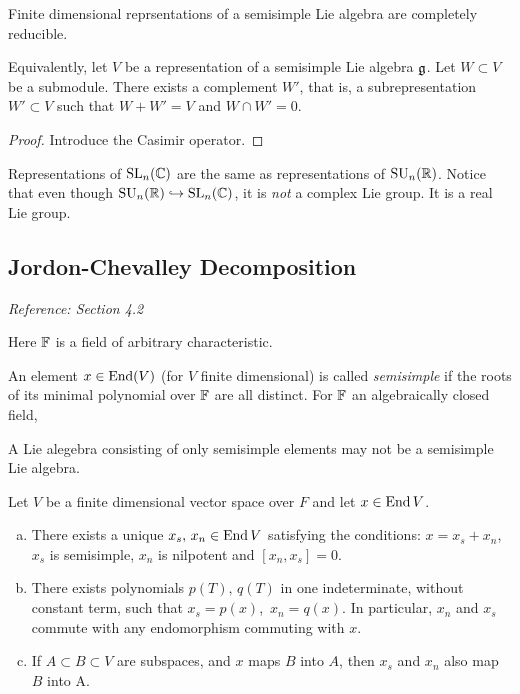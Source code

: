 \begin{theorem}
    \label{thm:weyl}
    Finite dimensional reprsentations of a semisimple Lie algebra are completely reducible. 

    Equivalently, let $V$ be a representation of a semisimple Lie algebra $\mathfrak{g}$. Let $W\subset V$ be a submodule. There exists a complement $W'$, that is, a subrepresentation $W'\subset V$ such that $W+W'=V$ and $W\cap W'=0$.
\end{theorem}
\begin{proof}
   Introduce the Casimir operator. 
\end{proof}

\begin{insight}
   Representations of $\text{SL}_n(\mathbb{C})$ are the same as representations of $\text{SU}_n(\mathbb{R})$. Notice that even though $\text{SU}_n(\mathbb{R}) \hookrightarrow \text{SL}_n(\mathbb{C})$, it is \emph{not} a complex Lie group. It is a real Lie group.
\end{insight}

\subsection{Jordon-Chevalley Decomposition}
\label{sub:jordon_chevalley_decomposition}

\emph{Reference: \cite{humphreys1972introduction} Section 4.2}

Here $\mathbb{F}$ is a field of arbitrary characteristic.

An element $x\in \operatorname{End}(V)$ (for $V$ finite dimensional) is called \emph{semisimple} if the roots of its minimal polynomial over $\mathbb{F}$ are all distinct. For $\mathbb{F}$ an algebraically closed field, 

\begin{insight}
   A Lie alegebra consisting of only semisimple elements may not be a semisimple Lie algebra.
\end{insight}

\begin{proposition}
    Let $V$ be a finite dimensional vector space over $F$ and let $x\in \operatorname{End} V$. 
\begin{enumerate}[(a)]
    \item There exists a unique $x_s,\, x_n\in \operatorname{End} V$ satisfying the conditions: $x= x_s + x_n$, $x_s$ is semisimple, $x_n$ is nilpotent and $[x_n,x_s]=0$.
    \item There exists polynomials $p(T),\, q(T)$ in one indeterminate, without constant term, such that $x_s = p(x)$,\, $x_n = q(x)$. In particular, $x_n$ and $x_s$ commute with any endomorphism commuting with $x$.
    \item If $A\subset B \subset V$ are subspaces, and $x$ maps $B$ into $A$, then $x_s$ and $x_n$ also map $B$ into A.
\end{enumerate}
\end{proposition}

